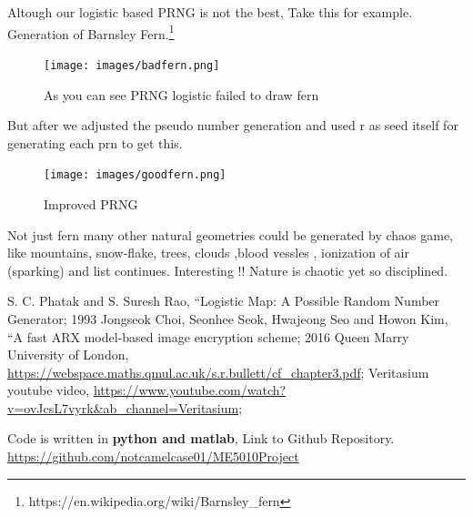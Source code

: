 \documentclass{report}
\begin{document}
Altough our logistic based PRNG is not the best, Take this for example. Generation of Barnsley Fern.\footnote[1]{https://en.wikipedia.org/wiki/Barnsley\_fern}
\begin{figure}[!h]
    \centering
    \texttt{[image: images/badfern.png]}
    \caption{As you can see PRNG logistic failed to draw fern}
    \label{fig:my_label13}
\end{figure}

But after we adjusted the pseudo number generation and used r as seed itself for generating each prn to get this.

\begin{figure}[!h]
    \centering
    \texttt{[image: images/goodfern.png]}
    \caption{Improved PRNG}
    \label{fig:my_label14}
\end{figure}
Not just fern many other natural geometries could be generated by chaos game, like mountains, snow-flake, trees, clouds ,blood vessles , ionization of air (sparking) and list continues. Interesting !!
Nature is chaotic yet so disciplined.
\newpage
\begin{thebibliography}{1}
	    S. C. Phatak and  S. Suresh Rao,
		``Logistic Map: A Possible Random Number
Generator;
		1993
	   Jongseok Choi, Seonhee Seok, Hwajeong Seo and Howon Kim,
		``A fast ARX model-based image encryption scheme;
		2016
		Queen Marry University of London,
		\url{https://webspace.maths.qmul.ac.uk/s.r.bullett/cf_chapter3.pdf};
		Veritasium youtube video,
		\url{https://www.youtube.com/watch?v=ovJcsL7vyrk&ab_channel=Veritasium};

	    Code is written in \textbf{python and matlab}, Link to Github Repository.  \url{https://github.com/notcamelcase01/ME5010Project}


\end{thebibliography}
\end{document}
